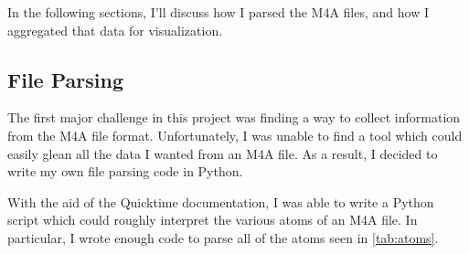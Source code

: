 \documentclass[journal]{vgtc}                %
\begin{document}
In the following sections, I'll discuss how I parsed the M4A files, and how
I aggregated that data for visualization.

\subsection{File Parsing}

The first major challenge in this project was finding a way to collect
information from the M4A file format. Unfortunately, I was unable to find a
tool which could easily glean all the data I wanted from an M4A file. As a result,
I decided to write my own file parsing code in Python.

With the aid of the Quicktime documentation, I was able to write a Python script
which could roughly interpret the various atoms of an M4A file. In particular,
I wrote enough code to parse all of the atoms seen in \autoref{tab:atoms}.
\end{document}
